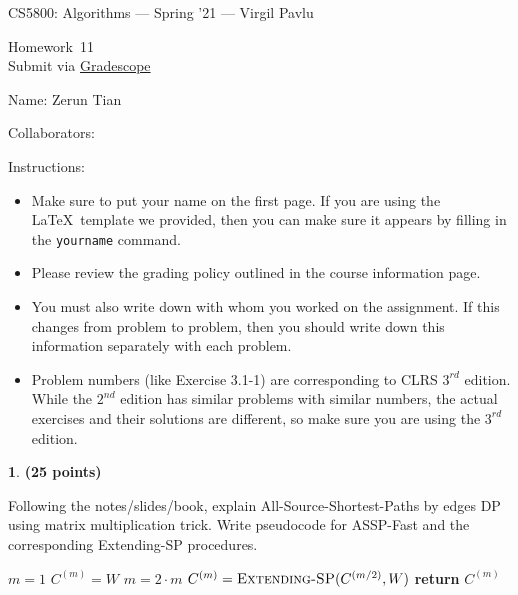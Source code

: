 \documentclass[11pt]{article}
\newcommand{\yourname}{Zerun Tian}
\newcommand{\yourcollaborators}{}
\theoremstyle{definition}
\newcommand{\instructor}{Virgil Pavlu}
\newcommand{\hwnum}{11}
\theoremstyle{theorem}
\newtheorem{prob}{}
\newcommand{\solution}{\medskip\noindent{\color{DarkBlue}\textbf{Solution:}}}
\begin{document}
{\Large 
\begin{center}{CS5800: Algorithms} --- Spring '21 --- \instructor \end{center}}
{\large
\vspace{10pt}
\noindent Homework~\hwnum \vspace{2pt}\\
Submit via \href{https://www.gradescope.com/courses/232127}{Gradescope}}

\bigskip
{\large \noindent Name: \yourname }

{\large \noindent Collaborators: \yourcollaborators}

\vspace{15pt}

{\large \noindent Instructions:}

\begin{itemize}

\item Make sure to put your name on the first page.  If you are using the \LaTeX~template we provided, then you can make sure it appears by filling in the \texttt{yourname} command.

\item Please review the grading policy outlined in the course information page.

\item You must also write down with whom you worked on the assignment.  If this changes from problem to problem, then you should write down this information separately with each problem.

\item Problem numbers (like Exercise 3.1-1) are corresponding to CLRS $3^{rd}$ edition.  While the  $2^{nd}$ edition  has  similar  problems  with  similar  numbers,  the  actual  exercises  and their solutions are different, so make sure you are using the $3^{rd}$ edition.

\end{itemize}

\newpage
\begin{prob} \textbf{(25 points)} 
\end{prob}
Following the notes/slides/book, explain All-Source-Shortest-Paths by edges DP using matrix multiplication trick.  Write pseudocode for ASSP-Fast and the corresponding Extending-SP procedures.

\solution

\begin{algorithmic}[1]
 
	\State $m = 1$
	\State $C^{(m)} = W$
		\State $m = 2 \cdot m$
		\State $C^{(m)} = \textproc{\textsc{Extending-SP}}(C^{(m/2)}, W)$
	\EndWhile
	\State \textbf{return} $C^{(m)}$
\EndFunction
\end{algorithmic}
\end{document}
